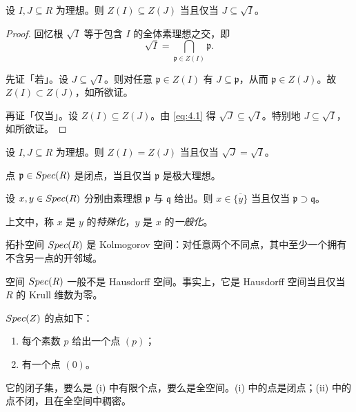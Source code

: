 \begin{lemma}\label{lem:4.1.4}
设 $I, J \subseteq R$ 为理想。则 $Z(I) \subseteq Z(J)$ 当且仅当 $J \subseteq \sqrt{I}$。
\end{lemma}

\begin{proof}
回忆根 $\sqrt{I}$ 等于包含 $I$ 的全体素理想之交，即
\begin{equation}\tag{4.1}\label{eq:4.1}
\sqrt{I} = \bigcap_{\mathfrak p \in Z(I)} \mathfrak p .
\end{equation}

先证「若」。设 $J \subseteq \sqrt{I}$。则对任意 $\mathfrak p \in Z(I)$ 有 $J \subseteq \mathfrak p$，从而 $\mathfrak p \in Z(J)$。故 $Z(I) \subset Z(J)$，如所欲证。

再证「仅当」。设 $Z(I) \subseteq Z(J)$。由 \eqref{eq:4.1} 得 $\sqrt{J} \subseteq \sqrt{I}$。特别地 $J \subseteq \sqrt{I}$，如所欲证。
\end{proof}

\begin{corollary}\label{cor:4.1.5}
设 $I, J \subseteq R$ 为理想。则 $Z(I) = Z(J)$ 当且仅当 $\sqrt{J} = \sqrt{I}$。
\end{corollary}

\begin{corollary}\label{cor:4.1.6}
点 $\mathfrak p \in Spec(R)$ 是闭点，当且仅当 $\mathfrak p$ 是极大理想。
\end{corollary}

\begin{corollary}\label{cor:4.1.7}
设 $x, y \in Spec(R)$ 分别由素理想 $\mathfrak p$ 与 $\mathfrak q$ 给出。则 $x \in \overline{\{y\}}$ 当且仅当 $\mathfrak p \supset \mathfrak q$。
\end{corollary}

上文中，称 $x$ 是 $y$ 的\emph{特殊化}，$y$ 是 $x$ 的\emph{一般化}。

\begin{corollary}\label{cor:4.1.8}
拓扑空间 $Spec(R)$ 是 Kolmogorov 空间：对任意两个不同点，其中至少一个拥有不含另一点的开邻域。
\end{corollary}

\begin{remark}\label{rem:4.1.9}
空间 $Spec(R)$ 一般不是 Hausdorff 空间。事实上，它是 Hausdorff 空间当且仅当 $R$ 的 Krull 维数为零。
\end{remark}

\begin{example}\label{ex:4.1.10}
$Spec(Z)$ 的点如下：
\begin{enumerate}[label=(\roman*),leftmargin=2em,itemsep=0.25ex]
  \item 每个素数 $p$ 给出一个点 $(p)$；
  \item 有一个点 $(0)$。
\end{enumerate}
它的闭子集，要么是 (i) 中有限个点，要么是全空间。(i) 中的点是闭点；(ii) 中的点不闭，且在全空间中稠密。
\end{example}

